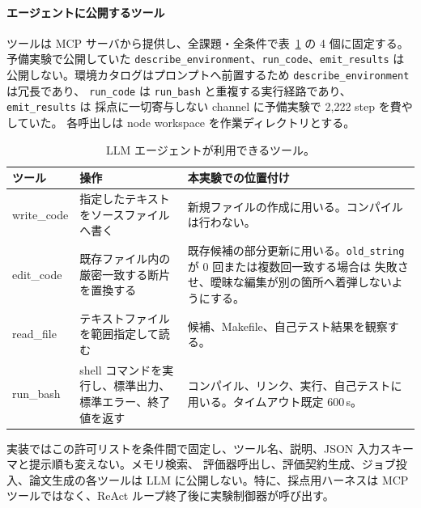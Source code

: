 \documentclass[conference,letterpaper]{IEEEtran}
\begin{document}
\paragraph{エージェントに公開するツール}
ツールは MCP サーバから提供し、全課題・全条件で表~\ref{tab:tools} の 4 個に固定する。
予備実験で公開していた \texttt{describe\_environment}、\texttt{run\_code}、\texttt{emit\_results} は
公開しない。環境カタログはプロンプトへ前置するため \texttt{describe\_environment} は冗長であり、
\texttt{run\_code} は \texttt{run\_bash} と重複する実行経路であり、\texttt{emit\_results} は
採点に一切寄与しない channel に予備実験で 2{,}222 step を費やしていた。
各呼出しは node workspace を作業ディレクトリとする。
\begin{table}[t]\centering\footnotesize
\caption{LLM エージェントが利用できるツール。}
\label{tab:tools}
\begin{tabular}{>{\ttfamily}lp{4.9cm}p{6.3cm}}
\toprule
\normalfont ツール & 操作 & 本実験での位置付け \\
\midrule
write\_code & 指定したテキストをソースファイルへ書く
  & 新規ファイルの作成に用いる。コンパイルは行わない。\\
edit\_code & 既存ファイル内の厳密一致する断片を置換する
  & 既存候補の部分更新に用いる。\texttt{old\_string} が 0 回または複数回一致する場合は
    失敗させ、曖昧な編集が別の箇所へ着弾しないようにする。\\
read\_file & テキストファイルを範囲指定して読む
  & 候補、Makefile、自己テスト結果を観察する。\\
run\_bash & shell コマンドを実行し、標準出力、標準エラー、終了値を返す
  & コンパイル、リンク、実行、自己テストに用いる。タイムアウト既定 600\,s。\\
\bottomrule
\end{tabular}
\end{table}

実装ではこの許可リストを条件間で固定し、ツール名、説明、JSON 入力スキーマと提示順も変えない。メモリ検索、
評価器呼出し、評価契約生成、ジョブ投入、論文生成の各ツールは LLM に公開しない。特に、採点用ハーネスは MCP
ツールではなく、ReAct ループ終了後に実験制御器が呼び出す。
\end{document}
